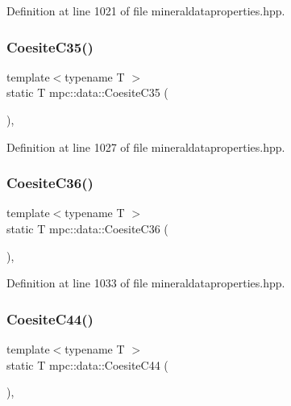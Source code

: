 Definition at line 1021 of file mineraldataproperties.\+hpp.

\mbox{\label{namespacempc_1_1data_aeb581837ff89f3539a4eb622b306487c}} 
\subsubsection{\texorpdfstring{Coesite\+C35()}{CoesiteC35()}}
{\footnotesize\ttfamily template$<$typename T $>$ \\
static T mpc\+::data\+::\+Coesite\+C35 (\begin{DoxyParamCaption}{ }\end{DoxyParamCaption})\hspace{0.3cm}{\ttfamily [inline]}, {\ttfamily [static]}}



Definition at line 1027 of file mineraldataproperties.\+hpp.

\mbox{\label{namespacempc_1_1data_ae0f8af5d94ac289764e8a1c452113eeb}} 
\subsubsection{\texorpdfstring{Coesite\+C36()}{CoesiteC36()}}
{\footnotesize\ttfamily template$<$typename T $>$ \\
static T mpc\+::data\+::\+Coesite\+C36 (\begin{DoxyParamCaption}{ }\end{DoxyParamCaption})\hspace{0.3cm}{\ttfamily [inline]}, {\ttfamily [static]}}



Definition at line 1033 of file mineraldataproperties.\+hpp.

\mbox{\label{namespacempc_1_1data_aedee2a3507900fa2a536860a4e72a2b1}} 
\subsubsection{\texorpdfstring{Coesite\+C44()}{CoesiteC44()}}
{\footnotesize\ttfamily template$<$typename T $>$ \\
static T mpc\+::data\+::\+Coesite\+C44 (\begin{DoxyParamCaption}{ }\end{DoxyParamCaption})\hspace{0.3cm}{\ttfamily [inline]}, {\ttfamily [static]}}



